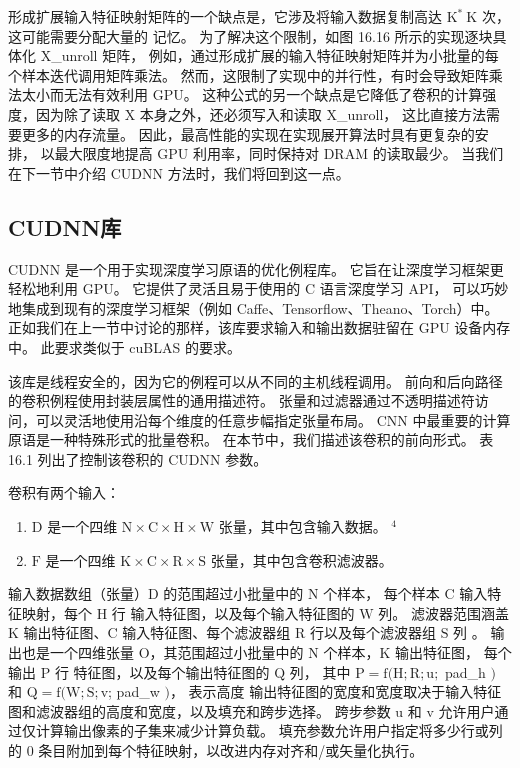 形成扩展输入特征映射矩阵的一个缺点是，它涉及将输入数据复制高达 $\mathrm{K}^{*} \mathrm{~K}$ 次，
这可能需要分配大量的 记忆。 为了解决这个限制，如图 16.16 所示的实现逐块具体化 X\_unroll 矩阵，
例如，通过形成扩展的输入特征映射矩阵并为小批量的每个样本迭代调用矩阵乘法。 
然而，这限制了实现中的并行性，有时会导致矩阵乘法太小而无法有效利用 GPU。 
这种公式的另一个缺点是它降低了卷积的计算强度，因为除了读取 $\mathrm{X}$ 本身之外，还必须写入和读取 X\_unroll，
这比直接方法需要更多的内存流量。 因此，最高性能的实现在实现展开算法时具有更复杂的安排，
以最大限度地提高 GPU 利用率，同时保持对 DRAM 的读取最少。 当我们在下一节中介绍 CUDNN 方法时，我们将回到这一点。

\subsection{CUDNN库}
CUDNN 是一个用于实现深度学习原语的优化例程库。 它旨在让深度学习框架更轻松地利用 GPU。 
它提供了灵活且易于使用的 C 语言深度学习 API， 
可以巧妙地集成到现有的深度学习框架（例如 Caffe、Tensorflow、Theano、Torch）中。 
正如我们在上一节中讨论的那样，该库要求输入和输出数据驻留在 GPU 设备内存中。 
此要求类似于 cuBLAS 的要求。

该库是线程安全的，因为它的例程可以从不同的主机线程调用。 前向和后向路径的卷积例程使用封装层属性的通用描述符。 
张量和过滤器通过不透明描述符访问，可以灵活地使用沿每个维度的任意步幅指定张量布局。 
$\mathrm{CNN}$ 中最重要的计算原语是一种特殊形式的批量卷积。 
在本节中，我们描述该卷积的前向形式。 表 16.1 列出了控制该卷积的 CUDNN 参数。

卷积有两个输入：
\begin{enumerate}
   \item $\mathrm{D}$ 是一个四维 $\mathrm{N} \times \mathrm{C} \times \mathrm{H} \times \mathrm{W}$ 张量，其中包含输入数据。 ${ }^{4}$

   \item $\mathrm{F}$ 是一个四维 $\mathrm{K} \times \mathrm{C} \times \mathrm{R} \times \mathrm{S}$ 张量，其中包含卷积滤波器。
\end{enumerate}

输入数据数组（张量）$\mathrm{D}$ 的范围超过小批量中的 $\mathrm{N}$ 个样本，
每个样本 $\mathrm{C}$ 输入特征映射，每个 $\mathrm{H}$ 行 输入特征图，以及每个输入特征图的 $\mathrm{W}$ 列。 
滤波器范围涵盖 $\mathrm{K}$ 输出特征图、$\mathrm{C}$ 输入特征图、每个滤波器组 $\mathrm{R}$ 行以及每个滤波器组 $\mathrm{S}$ 列 。 
输出也是一个四维张量 $\mathrm{O}$，其范围超过小批量中的 $\mathrm{N}$ 个样本，$\mathrm{K}$ 输出特征图，
每个输出 $\mathrm{P}$ 行 特征图，以及每个输出特征图的 $\mathrm{Q}$ 列，
其中 $\mathrm{P}=\mathrm{f}(\mathrm{H} ; \mathrm{R} ; \mathrm{u} ;$ pad\_h $)$ 
和 $\mathrm{Q}=\mathrm{f}(\mathrm{W} ; \mathrm{S} ; \mathrm{v}$; pad\_w $)$，
表示高度 输出特征图的宽度和宽度取决于输入特征图和滤波器组的高度和宽度，以及填充和跨步选择。 
跨步参数 $\mathrm{u}$ 和 $\mathrm{v}$ 允许用户通过仅计算输出像素的子集来减少计算负载。 
填充参数允许用户指定将多少行或列的 0 条目附加到每个特征映射，以改进内存对齐和/或矢量化执行。

